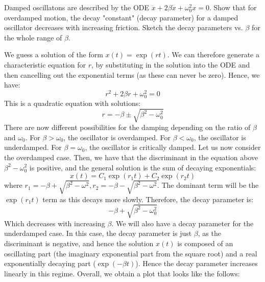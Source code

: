 \documentclass[../PHYS306Notes.tex]{subfiles}
\begin{document}
\begin{p}
Damped oscillatons are described by the ODE $\ddot{x} + 2\beta\dot{x} + \omega_0^2x = 0$. Show that for overdamped motion, the decay "constant" (decay parameter) for a damped oscillator decreases with increasing friction. Sketch the decay parameters vs. $\beta$ for the whole range of $\beta$.
\end{p}
\begin{s}
We guess a solution of the form $x(t) = \exp(rt)$. We can therefore generate a characteristic equation for $r$, by substituting in the solution into the ODE and then cancelling out the exponential terms (as these can never be zero). Hence, we have:
\[r^2 + 2\beta r  + \omega_0^2 = 0\]
This is a quadratic equation with solutions:
\[r = -\beta \pm \sqrt{\beta^2 - \omega_0^2}\]
There are now different possibilities for the damping depending on the ratio of $\beta$ and $\omega_0$. For $\beta > \omega_0$, the oscillator is overdamped. For $\beta < \omega_0$, the oscillator is underdamped. For $\beta = \omega_0$, the oscillator is critically damped. Let us now consider the overdamped case. Then, we have that the discriminant in the equation above $\beta^2 - \omega_0^2$ is positive, and the general solution is the sum of decaying exponentials:
\[x(t) = C_1\exp(r_1 t) + C_2\exp(r_2 t) \]
where $r_1 = -\beta + \sqrt{\beta^2 - \omega^2}, r_2 = -\beta - \sqrt{\beta^2 - \omega^2}$. The dominant term will be the $\exp(r_1 t)$ term as this decays more slowly. Therefore, the decay parameter is:
\[-\beta + \sqrt{\beta^2 -\omega_0^2}\]
Which decreases with increasing $\beta$. We will also have a decay parameter for the underdamped case. In this case, the decay parameter is just $\beta$, as the discriminant is negative, and hence the solution $x(t)$ is composed of an oscillating part (the imaginary exponential part from the square root) and a real exponentially decaying part ($\exp(-\beta t)$). Hence the decay parameter increases linearly in this regime. Overall, we obtain a plot that looks like the follows:


\end{s}
\end{document}
